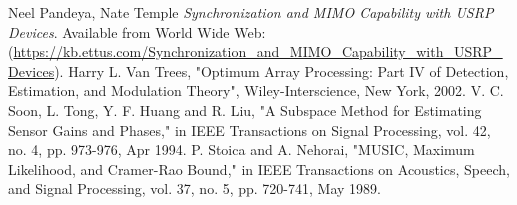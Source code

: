 \documentclass[a4paper, 11pt]{article}
\begin{document}
\begin{thebibliography}{9}
 Neel Pandeya, Nate Temple \emph{Synchronization and MIMO Capability with USRP Devices}. Available from World Wide Web: (\url{https://kb.ettus.com/Synchronization_and_MIMO_Capability_with_USRP_Devices}).
 Harry L. Van Trees, "Optimum Array Processing: Part IV of Detection, Estimation, and Modulation Theory", Wiley-Interscience, New York, 2002.
 V. C. Soon, L. Tong, Y. F. Huang and R. Liu, "A Subspace Method for Estimating Sensor Gains and Phases," in IEEE Transactions on Signal Processing, vol. 42, no. 4, pp. 973-976, Apr 1994.
 P. Stoica and A. Nehorai, "MUSIC, Maximum Likelihood, and Cramer-Rao Bound," in IEEE Transactions on Acoustics, Speech, and Signal Processing, vol. 37, no. 5, pp. 720-741, May 1989.
\end{thebibliography}
\end{document}
